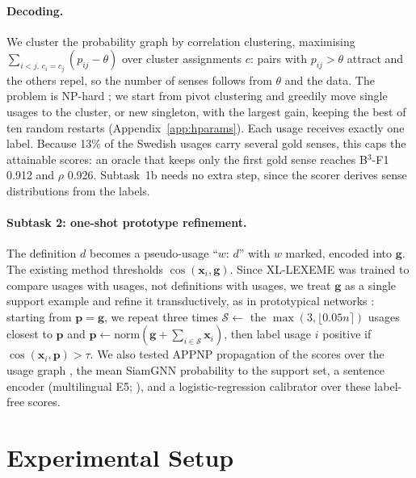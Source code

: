 \documentclass[11pt]{article}
\newcommand{\sys}{SiamGNN\xspace}
\newcommand{\xll}{XL-LEXEME\xspace}
\newcommand{\bcubed}{B$^3$-F1\xspace}
\begin{document}
\paragraph{Decoding.}
We cluster the probability graph by correlation clustering, maximising $\sum_{i<j,\,c_i=c_j}(p_{ij}-\theta)$ over cluster assignments $c$: pairs with $p_{ij}>\theta$ attract and the others repel, so the number of senses follows from $\theta$ and the data. The problem is NP-hard \citep{bansal2004correlation}; we start from pivot clustering \citep{ailon2008aggregating} and greedily move single usages to the cluster, or new singleton, with the largest gain, keeping the best of ten random restarts (Appendix~\ref{app:hparams}). Each usage receives exactly one label. Because 13\% of the Swedish usages carry several gold senses, this caps the attainable scores: an oracle that keeps only the first gold sense reaches \bcubed 0.912 and $\rho$ 0.926. Subtask~1b needs no extra step, since the scorer derives sense distributions from the labels.

\paragraph{Subtask 2: one-shot prototype refinement.}
The definition $d$ becomes a pseudo-usage ``$w$: $d$'' with $w$ marked, encoded into $\mathbf{g}$. The existing method thresholds $\cos(\mathbf{x}_i,\mathbf{g})$. Since \xll was trained to compare usages with usages, not definitions with usages, we treat $\mathbf{g}$ as a single support example and refine it transductively, as in prototypical networks \citep{snell2017prototypical}: starting from $\mathbf{p}=\mathbf{g}$, we repeat three times $\mathcal{S}\leftarrow$ the $\max(3,\lfloor 0.05n\rceil)$ usages closest to $\mathbf{p}$ and $\mathbf{p}\leftarrow\mathrm{norm}(\mathbf{g}+\sum_{i\in\mathcal{S}}\mathbf{x}_i)$, then label usage $i$ positive if $\cos(\mathbf{x}_i,\mathbf{p})>\tau$. We also tested APPNP propagation of the scores over the usage graph \citep{gasteiger2019predict}, the mean \sys probability to the support set, a sentence encoder (multilingual E5; \citealp{wang2024multilingual}), and a logistic-regression calibrator over these label-free scores.

\section{Experimental Setup}
\end{document}
